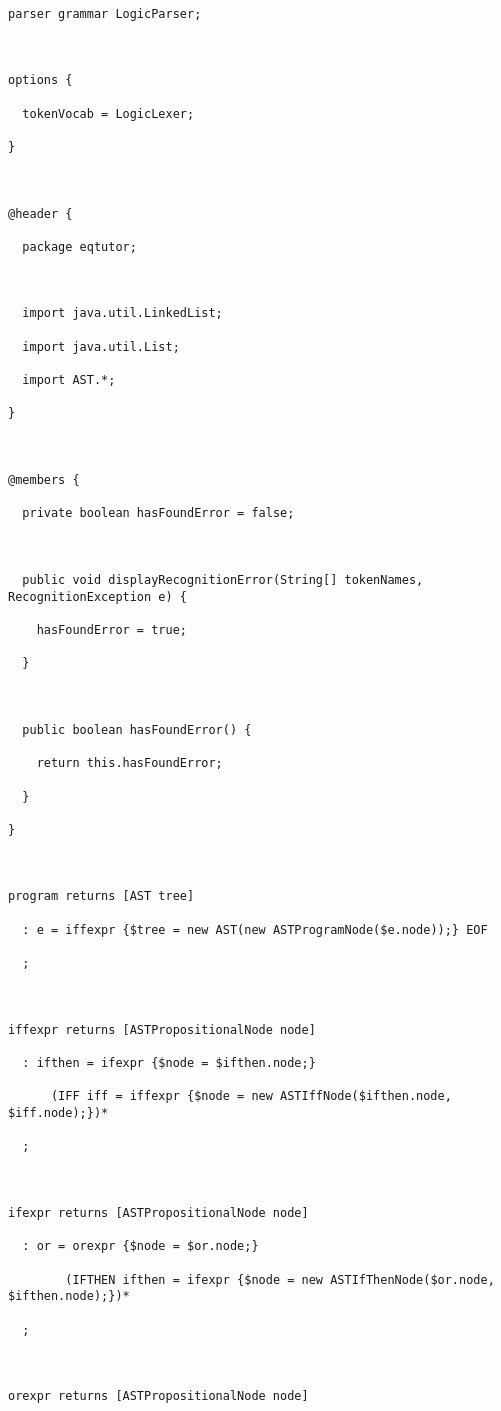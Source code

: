 \documentclass[12pt]{article}
\begin{document}
\begin{verbatim}

parser grammar LogicParser;



options {

  tokenVocab = LogicLexer;

}



@header {

  package eqtutor;

  

  import java.util.LinkedList;

  import java.util.List;

  import AST.*;

}



@members {

  private boolean hasFoundError = false;

  

  public void displayRecognitionError(String[] tokenNames, RecognitionException e) {

    hasFoundError = true;

  }

  

  public boolean hasFoundError() {

    return this.hasFoundError;

  }

}



program returns [AST tree]

  : e = iffexpr {$tree = new AST(new ASTProgramNode($e.node));} EOF

  ;



iffexpr returns [ASTPropositionalNode node]

  : ifthen = ifexpr {$node = $ifthen.node;} 

	  (IFF iff = iffexpr {$node = new ASTIffNode($ifthen.node, $iff.node);})*

  ;

  	

ifexpr returns [ASTPropositionalNode node]

  : or = orexpr {$node = $or.node;} 

		(IFTHEN ifthen = ifexpr {$node = new ASTIfThenNode($or.node, $ifthen.node);})*

  ;



orexpr returns [ASTPropositionalNode node]


\end{verbatim}
\end{document}
